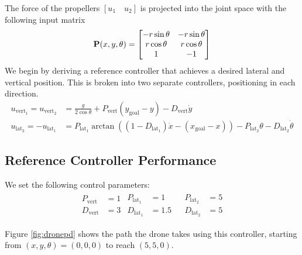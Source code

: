 \noindent The force of the propellers $\left [ u_1 \quad u_2 \right ]$ is projected into the joint space with the following input matrix
\begin{align*}
    \P(x, y, \theta) = \begin{bmatrix}
    -r\sin{\theta} & -r\sin{\theta} \\ 
    r\cos{\theta} & r\cos{\theta} \\ 
    1 & -1 
    \end{bmatrix}
\end{align*}
\noindent We begin by deriving a reference controller that achieves a desired lateral and vertical position. This is broken into two separate controllers, positioning in each direction. 
\begin{align}
    u_{\text{vert}_1} = u_{\text{vert}_2} &= \frac{g}{2 \cos{\theta}} + P_{\text{vert}} \left (y_{\text{goal}} -  y\right) - D_{\text{vert}}\dot{y} \\
    u_{\text{lat}_2} = -u_{\text{lat}_1} &= P_{\text{lat}_1}\arctan{\left ((1 - D_{\text{lat}_1})\dot{x} - (x_{\text{goal}} - x) \right )} -  P_{\text{lat}_2}\theta - D_{\text{lat}_2}\dot{\theta}
\end{align}
\subsection{Reference Controller Performance}

\noindent We set the following control parameters:
\begin{align*}
\begin{split}
    P_{\text{vert}} &= 1 \\
    D_{\text{vert}} &= 3
\end{split}
\begin{split}
    P_{\text{lat}_1} &= 1 \\
    D_{\text{lat}_1} &= 1.5
\end{split}
\begin{split}
\end{split}
\begin{split}
    P_{\text{lat}_2} &= 5 \\
    D_{\text{lat}_2} &= 5
\end{split}
\end{align*}

\noindent Figure \ref{fig:dronepd} shows the path the drone takes using this controller, starting from $(x, y, \theta) = (0, 0, 0)$ to reach $(5, 5, 0)$.

